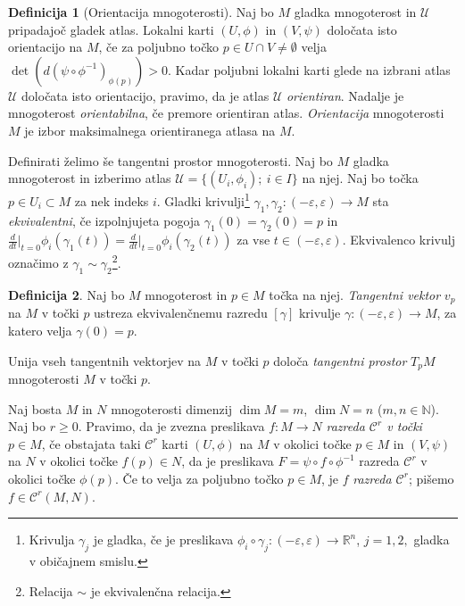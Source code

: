 \documentclass[12pt,a4paper,twoside]{article}
\theoremstyle{definition} %
\newtheorem{definicija}{Definicija}[section]
\theoremstyle{plain} %
\numberwithin{equation}{section}  %
\newcommand{\N}{\mathbb N}
\begin{document}
\begin{definicija} [Orientacija mnogoterosti]
Naj bo $M$ gladka mnogoterost in $\mathcal{U}$ pripadajoč gladek atlas. Lokalni karti $(U, \phi)$ in $(V, \psi)$ določata isto orientacijo na $M$, če za poljubno točko $p \in U \cap V \neq \emptyset$ velja $\det (d(\psi \circ \phi ^{-1})_{\phi (p)}) > 0.$ Kadar poljubni lokalni karti glede na izbrani atlas $\mathcal{U}$ določata isto orientacijo, pravimo, da je atlas $\mathcal{U}$ \emph{orientiran}. Nadalje je mnogoterost \emph{orientabilna}, če premore orientiran atlas. \emph{Orientacija} mnogoterosti $M$ je izbor maksimalnega orientiranega atlasa na $M$.
\end{definicija}

Definirati želimo še tangentni prostor mnogoterosti. Naj bo $M$ gladka mnogoterost in izberimo atlas $\mathcal{U} = \{ (U_{i}, \phi_{i}) ; \ i \in I \}$ na njej. Naj bo točka $p \in U_{i} \subset M$ za nek indeks $i$.  Gladki krivulji\footnote{Krivulja $\gamma_{j}$ je gladka, če je preslikava $ \phi_{i} \circ \gamma_{j} \colon (-\varepsilon, \varepsilon) \to \mathbb{R}^{n}$, $j=1,2,$ gladka v običajnem smislu.} 
$\gamma_{1}, \gamma_{2} \colon (-\varepsilon, \varepsilon) \to M$ sta \emph{ekvivalentni}, če izpolnjujeta pogoja
$\gamma_{1}(0) = \gamma_{2}(0) = p$ in $ \frac{d}{dt} \big|_{t=0} \phi_{i}(\gamma_{1}(t)) =  \frac{d}{dt} \big|_{t=0} \phi_{i}(\gamma_{2}(t))$ za vse $t \in (-\varepsilon, \varepsilon)$. Ekvivalenco krivulj označimo z $\gamma_{1} \sim \gamma_{2}$\footnote{Relacija $\sim$ je ekvivalenčna relacija.}.

\begin{definicija}
Naj bo $M$ mnogoterost in $p \in M$ točka na njej. \emph{Tangentni vektor} $v_{p}$ na $M$ v točki $p$ ustreza ekvivalenčnemu razredu $[\gamma]$ krivulje $\gamma \colon (-\varepsilon, \varepsilon) \to M$, za katero velja $\gamma (0) = p$.

Unija vseh tangentnih vektorjev na $M$ v točki $p$ določa \emph{tangentni prostor} $T_{p}M$ mnogoterosti $M$ v točki $p$.
\end{definicija}

Naj bosta $M$ in $N$ mnogoterosti dimenzij $\dim M = m$, $\dim N = n$ ($m, n \in \N$). Naj bo $r \geq 0$. Pravimo, da je zvezna preslikava $f \colon M \to N$ \emph{razreda $\mathcal{C}^{r}$ v točki} $p \in M$, če obstajata taki $\mathcal{C}^{r}$ karti $(U, \phi)$ na $M$ v okolici točke $p \in M$ in $(V, \psi)$ na $N$ v okolici točke $f(p) \in N$, da je preslikava $F = \psi \circ f \circ \phi^{-1}$ razreda $\mathcal{C}^{r}$ v okolici točke $\phi(p)$.
Če to velja za poljubno točko $p \in M$, je $f$ \emph{razreda $\mathcal{C}^{r}$}; pišemo $f \in  \mathcal{C}^{r}(M,N)$.
\end{document}
